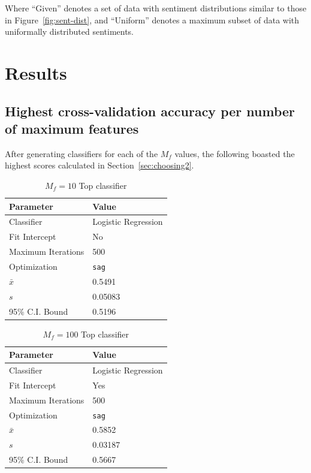 \documentclass[11pt]{article}
\begin{document}
Where ``Given'' denotes a set of data with sentiment distributions similar to those in Figure~\ref{fig:sent-dist},
and ``Uniform'' denotes a maximum subset of data with uniformally distributed sentiments.

\section{Results}\label{sec:results}

\subsection{Highest cross-validation accuracy per number of maximum features}\label{sec:mfresults}

After generating classifiers for each of the $M_f$ values, 
the following boasted the highest scores calculated in Section~\ref{sec:choosing2}.

\begin{table}[H]
	\begin{center}
		\begin{tabular}{|l|l|}			
			\hline
			Parameter & Value \\
			\hline
			Classifier & Logistic Regression \\
			Fit Intercept & No \\
			Maximum Iterations & 500 \\
			Optimization & \texttt{sag} \\
			\hline\hline
			$\bar{x}$ &  0.5491\\
			$s$ &  0.05083 \\
			95\% C.I. Bound & 0.5196 \\
			\hline
		\end{tabular}
		\caption{$M_f = 10$ Top classifier}
		\label{tbl:mf10}
	\end{center}
\end{table}

\begin{table}[H]
	\begin{center}
		\begin{tabular}{|l|l|}			
			\hline
			Parameter & Value \\
			\hline
			Classifier & Logistic Regression \\
			Fit Intercept & Yes \\
			Maximum Iterations & 500 \\
			Optimization & \texttt{sag} \\
			\hline\hline
			$\bar{x}$ &  0.5852\\
			$s$ &  0.03187 \\
			95\% C.I. Bound & 0.5667 \\
			\hline
		\end{tabular}
		\caption{$M_f = 100$ Top classifier}
		\label{tbl:mf100}
	\end{center}
\end{table}
\end{document}
